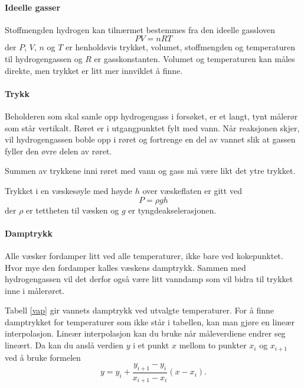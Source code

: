 	\paragraph{Ideelle gasser}
	Stoffmengden hydrogen kan tilnærmet bestemmes fra den ideelle gassloven
	\begin{equation}
	PV = nRT
	\end{equation}
	der $P$, $V$, $n$ og $T$ er henholdsvis trykket, volumet, stoffmengden og temperaturen til hydrogengassen og $R$ er gasskonstanten. Volumet og temperaturen kan måles direkte, men trykket er litt mer innviklet å finne. 
	
	\paragraph{Trykk}
	Beholderen som skal samle opp hydrogengass i forsøket, er et langt, tynt målerør som står vertikalt. Røret er i utgangpunktet fylt med vann. Når reaksjonen skjer, vil hydrogengassen boble opp i røret og fortrenge en del av vannet slik at gassen fyller den øvre delen av røret. 
	
	Summen av trykkene inni røret med vann og gass må være likt det ytre trykket. 
	
	Trykket i en væskesøyle med høyde $h$ over væskeflaten er gitt ved 
	\begin{equation}
	P=\rho gh \label{eq:rgh}
	\end{equation}
	der $\rho$ er tettheten til væsken og $g$ er tyngdeakselerasjonen.
	
	\paragraph{Damptrykk}
	Alle væsker fordamper litt ved alle temperaturer, ikke bare ved kokepunktet. Hvor mye den fordamper kalles væskens damptrykk. Sammen med hydrogengassen vil det derfor også være litt vanndamp som vil bidra til trykket inne i målerøret.
	
	Tabell \ref{vap} gir vannets damptrykk ved utvalgte temperaturer. For å finne damptrykket for temperaturer som ikke står i tabellen, kan man gjøre en lineær interpolasjon. Lineær interpolasjon kan du bruke når måleverdiene endrer seg lineært. Da kan du anslå verdien $y$ i et punkt $x$ mellom to punkter $x_i$ og $x_{i+1}$  ved å bruke formelen
	\begin{equation}
	y = y_i + \frac{y_{i+1} - y_i}{x_{i+1} - x_i}(x-x_i). \label{eq:inter}
	\end{equation}
	

